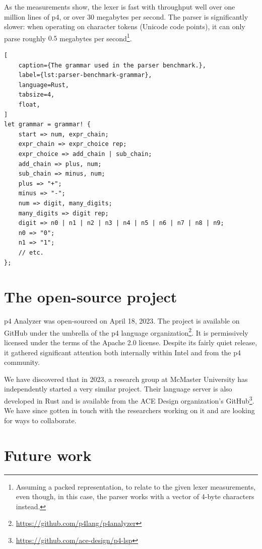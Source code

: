 As the measurements show, the lexer is fast with throughput well over one
million lines of \acrshort{p4}, or over \(30\) megabytes per second. The parser
is significantly slower: when operating on character tokens (Unicode code
points), it can only parse roughly \(0.5\) megabytes per
second\footnote{Assuming a packed representation, to relate to the given lexer
measurements, even though, in this case, the parser works with a vector of
4-byte characters instead.}.

\begin{lstlisting}[
	caption={The grammar used in the parser benchmark.},
	label={lst:parser-benchmark-grammar},
	language=Rust,
	tabsize=4,
	float,
]
let grammar = grammar! {
	start => num, expr_chain;
	expr_chain => expr_choice rep;
	expr_choice => add_chain | sub_chain;
	add_chain => plus, num;
	sub_chain => minus, num;
	plus => "+";
	minus => "-";
	num => digit, many_digits;
	many_digits => digit rep;
	digit => n0 | n1 | n2 | n3 | n4 | n5 | n6 | n7 | n8 | n9;
	n0 => "0";
	n1 => "1";
	// etc.
};
\end{lstlisting}

\section{The open-source project}

\acrshort{p4} Analyzer was open-sourced on April 18, 2023. The project is
available on GitHub under the umbrella of the \acrshort{p4} language
organization\footnote{\url{https://github.com/p4lang/p4analyzer}}. It is
permissively licensed under the terms of the Apache 2.0 license. Despite its
fairly quiet release, it gathered significant attention both internally within
Intel and from the \acrshort{p4} community.

We have discovered that in 2023, a research group at McMaster University has
independently started a very similar project. Their \pfs language server is also
developed in Rust and is available from the ACE Design organization's
GitHub\footnote{\url{https://github.com/ace-design/p4-lsp}}. We have since
gotten in touch with the researchers working on it and are looking for ways to
collaborate.

\section{Future work}



